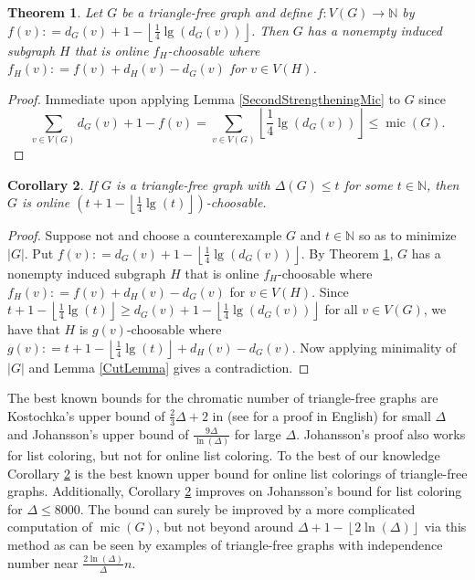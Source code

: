\documentclass[12pt]{article}
\theoremstyle{plain}
\newtheorem{thm}{Theorem}[section]
\newtheorem{cor}[thm]{Corollary}
\theoremstyle{definition}
\theoremstyle{remark}
\newcommand{\IN}{\mathbb{N}}
\newcommand{\card}[1]{\left|#1\right|}
\newcommand{\floor}[1]{\left\lfloor#1\right\rfloor}
\newcommand{\func}[3]{#1\colon #2 \rightarrow #3}
\newcommand{\parens}[1]{\left( #1 \right)}
\newcommand{\DefinedAs}{\mathrel{\mathop:}=}
\newcommand{\mic}{\operatorname{mic}}
\begin{document}
\begin{thm}\label{triangle-free-chooooser}
Let $G$ be a triangle-free graph and define $\func{f}{V(G)}{\IN}$ by $f(v) \DefinedAs d_G(v) + 1 - \floor{\frac14 \lg(d_G(v))}$.  Then $G$ has a nonempty induced subgraph $H$ that is online $f_H$-choosable where $f_H(v) \DefinedAs f(v) + d_H(v) - d_G(v)$ for $v \in V(H)$.
\end{thm}
\begin{proof}
Immediate upon applying Lemma \ref{SecondStrengtheningMic} to $G$ since 
\[\sum_{v \in V(G)} d_G(v) + 1 - f(v) = \sum_{v \in V(G)} \floor{\frac14 \lg(d_G(v))} \le \mic(G).\]
\end{proof}

\begin{cor}\label{tricolor}
If $G$ is a triangle-free graph with $\Delta(G) \le t$ for some $t \in \IN$, then $G$ is online $\parens{t + 1 - \floor{\frac14 \lg(t)}}$-choosable.
\end{cor}
\begin{proof}
Suppose not and choose a counterexample $G$ and $t \in \IN$ so as to minimize $\card{G}$.  Put $f(v) \DefinedAs d_G(v) + 1 - \floor{\frac14 \lg(d_G(v))}$.  By Theorem \ref{triangle-free-chooooser}, $G$ has a nonempty induced subgraph $H$ that is online $f_H$-choosable where $f_H(v) \DefinedAs f(v) + d_H(v) - d_G(v)$ for $v \in V(H)$.  Since $t + 1 - \floor{\frac14 \lg(t)} \ge d_G(v) + 1 - \floor{\frac14 \lg(d_G(v))}$ for all $v \in V(G)$, we have that $H$ is $g(v)$-choosable where $g(v) \DefinedAs t + 1 - \floor{\frac14 \lg(t)} + d_H(v) - d_G(v)$.  Now applying minimality of $\card{G}$ and Lemma \ref{CutLemma} gives a contradiction.
\end{proof}

The best known bounds for the chromatic number of triangle-free graphs are Kostochka's upper bound of $\frac23 \Delta + 2$ in \cite{kostochka1982modification} (see \cite{rabern2010destroying} for a proof in English) for small $\Delta$ and Johansson's upper bound of $\frac{9\Delta}{\ln(\Delta)}$ for large $\Delta$.  Johansson's proof also works for list coloring, but not for online list coloring.  To the best of our knowledge Corollary \ref{tricolor} is the best known upper bound for online list colorings of triangle-free graphs.  Additionally, Corollary \ref{tricolor} improves on Johansson's bound for list coloring for $\Delta \le 8000$.  The bound can surely be improved by a more complicated computation of $\mic(G)$, but not beyond around $\Delta + 1 - \floor{2\ln(\Delta)}$ via this method as can be seen by examples of triangle-free graphs with independence number near $\frac{2\ln(\Delta)}{\Delta}n$.
\end{document}
